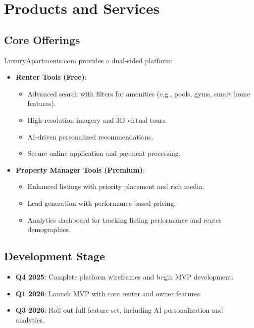 \documentclass[12pt]{article}
\begin{document}
\section{Products and Services}
\subsection{Core Offerings}
LuxuryApartments.com provides a dual-sided platform:
\begin{itemize}
    \item \textbf{Renter Tools (Free)}:
    \begin{itemize}
        \item Advanced search with filters for amenities (e.g., pools, gyms, smart home features).
        \item High-resolution imagery and 3D virtual tours.
        \item AI-driven personalized recommendations.
        \item Secure online application and payment processing.
    \end{itemize}
    \item \textbf{Property Manager Tools (Premium)}:
    \begin{itemize}
        \item Enhanced listings with priority placement and rich media.
        \item Lead generation with performance-based pricing.
        \item Analytics dashboard for tracking listing performance and renter demographics.
    \end{itemize}
\end{itemize}

\subsection{Development Stage}
\begin{itemize}
    \item \textbf{Q4 2025}: Complete platform wireframes and begin MVP development.
    \item \textbf{Q1 2026}: Launch MVP with core renter and owner features.
    \item \textbf{Q3 2026}: Roll out full feature set, including AI personalization and analytics.
\end{itemize}
\end{document}
